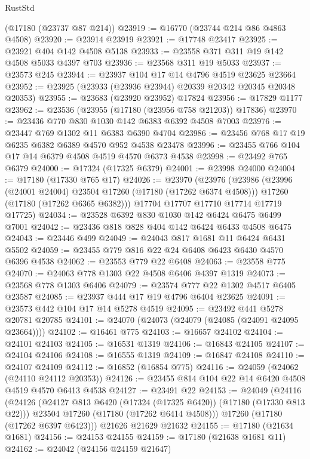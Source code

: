 \begin{lexlean}{RustStd}
\begin{coremodule}
    (@17180 (@23737 @87 @214))
@23919 := @16770 (@23744 @214 @86 @4863 @4508)
@23920 := @23914 @23919
@23921 := @17748 @23417
@23925 := @23921 @404 @142 @4508 @5138
@23933 := @23558 @371 @311 @19 @142 @4508 @5033 @4397 @703
@23936 := @23568 @311 @19 @5033
@23937 := @23573 @245
@23944 := @23937 @104 @17 @14 @4796 @4519 @23625 @23664
@23952 := @23925 (@23933 (@23936 @23944) @20339 @20342 @20345 @20348 @20353)
@23955 := @23683 (@23920 @23952) @17824
@23956 := @17829 @1177
@23962 := @23536 (@23955 (@17180 (@23956 @758 @21203)) @17836)
@23970 := @23436 @770 @830 @1030 @142 @6383 @6392 @4508 @7003
@23976 := @23447 @769 @1302 @11 @6383 @6390 @4704
@23986 := @23456 @768 @17 @19 @6235 @6382 @6389 @4570 @952 @4538 @23478
@23996 := @23455 @766 @104 @17 @14 @6379 @4508 @4519 @4570 @6373 @4538
@23998 := @23492 @765 @6379
@24000 := @17324 (@17325 @6379)
@24001 := @23998 @24000
@24004 := @17180 (@17330 @765 @17)
@24026 := @23970
    (@23976
      (@23986
        (@23996 (@24001 @24004) @23504 @17260 (@17180 (@17262 @6374 @4508)))
        @17260
        (@17180 (@17262 @6365 @6382)))
      @17704
      @17707
      @17710
      @17714
      @17719
      @17725)
@24034 := @23528 @6392 @830 @1030 @142 @6424 @6475 @6499 @7001
@24042 := @23436 @818 @828 @404 @142 @6424 @6433 @4508 @6475
@24043 := @23446 @499
@24049 := @24043 @817 @1681 @11 @6424 @6431 @5502
@24059 := @23455 @779 @816 @22 @24 @6408 @6423 @6430 @4570 @6396 @4538
@24062 := @23553 @779 @22 @6408
@24063 := @23558 @775
@24070 := @24063 @778 @1303 @22 @4508 @6406 @4397 @1319
@24073 := @23568 @778 @1303 @6406
@24079 := @23574 @777 @22 @1302 @4517 @6405 @23587
@24085 := @23937 @444 @17 @19 @4796 @6404 @23625
@24091 := @23573 @442 @104 @17 @14 @5278 @4519
@24095 := @23492 @441 @5278 @20781 @20785
@24101 := @24070 (@24073 (@24079 (@24085 (@24091 @24095 @23664))))
@24102 := @16461 @775
@24103 := @16657 @24102
@24104 := @24101 @24103
@24105 := @16531 @1319
@24106 := @16843 @24105
@24107 := @24104 @24106
@24108 := @16555 @1319
@24109 := @16847 @24108
@24110 := @24107 @24109
@24112 := @16852 (@16854 @775)
@24116 := @24059 (@24062 (@24110 @24112 @20353))
@24126 := @23455 @814 @104 @22 @14 @6420 @4508 @4519 @4570 @6413 @4538
@24127 := @23491 @22
@24153 := @24049
    (@24116
      (@24126
        (@24127 @813 @6420 (@17324 (@17325 @6420)) (@17180 (@17330 @813 @22)))
        @23504
        @17260
        (@17180 (@17262 @6414 @4508)))
      @17260
      (@17180 (@17262 @6397 @6423)))
    @21626
    @21629
    @21632
@24155 := @17180 (@21634 @1681)
@24156 := @24153 @24155
@24159 := @17180 (@21638 @1681 @11)
@24162 := @24042 (@24156 @24159 @21647)

\end{coremodule}
\end{lexlean}
